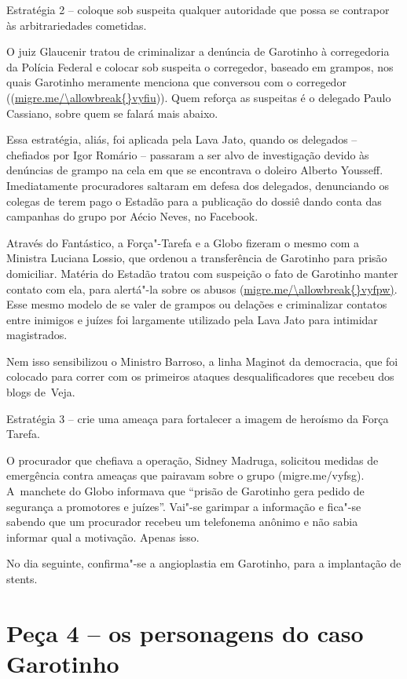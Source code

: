 Estratégia 2 -- coloque sob suspeita qualquer autoridade que possa se
contrapor às arbitrariedades cometidas.

O juiz Glaucenir tratou de criminalizar a denúncia de Garotinho à
corregedoria da Polícia Federal e colocar sob suspeita o corregedor,
baseado em grampos, nos quais Garotinho meramente menciona que conversou
com o corregedor ((\url{migre.me/\allowbreak{}vyfiu})). Quem reforça as
suspeitas é o delegado Paulo Cassiano, sobre quem se falará mais abaixo.

Essa estratégia, aliás, foi aplicada pela Lava Jato, quando os delegados
-- chefiados por Igor Romário -- passaram a ser alvo de investigação
devido às denúncias de grampo na cela em que se encontrava o doleiro
Alberto Yousseff. Imediatamente procuradores saltaram em defesa dos
delegados, denunciando os colegas de terem pago o Estadão para a
publicação do dossiê dando conta das campanhas do grupo por Aécio Neves,
no Facebook.

Através do Fantástico, a Força"-Tarefa e a Globo fizeram o mesmo com a
Ministra Luciana Lossio, que ordenou a transferência de Garotinho para
prisão domiciliar. Matéria do Estadão tratou com suspeição o fato de
Garotinho manter contato com ela, para alertá"-la sobre os abusos
(\url{migre.me/\allowbreak{}vyfpw)}. Esse mesmo modelo de se valer de grampos
ou delações e criminalizar contatos entre inimigos e juízes foi
largamente utilizado pela Lava Jato para intimidar magistrados.

Nem isso sensibilizou o Ministro Barroso, a linha Maginot da democracia,
que foi colocado para correr com os primeiros ataques desqualificadores
que recebeu dos blogs de~Veja.

Estratégia 3 -- crie uma ameaça para fortalecer a imagem de heroísmo da
Força Tarefa.

O procurador que chefiava a operação, Sidney Madruga, solicitou medidas
de emergência contra ameaças que pairavam sobre o grupo
({migre.me/\allowbreak{}vyfsg)}.
A~manchete do Globo informava que ``prisão de Garotinho gera pedido de
segurança a promotores e juízes''. Vai"-se garimpar a informação e
fica"-se sabendo que um procurador recebeu um telefonema anônimo e não
sabia informar qual a motivação. Apenas isso.

No dia seguinte, confirma"-se a angioplastia em Garotinho, para a
implantação de stents.

\section{Peça 4 -- os personagens do caso Garotinho}

